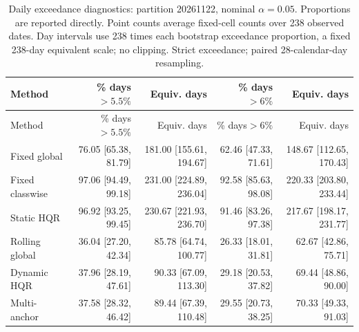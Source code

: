 \begingroup\small\setlength{\tabcolsep}{3pt}
\begin{longtable}{lrrrr}
\caption{Daily exceedance diagnostics: partition 20261122, nominal $\alpha=0.05$. Proportions are reported directly. Point counts average fixed-cell counts over 238 observed dates. Day intervals use 238 times each bootstrap exceedance proportion, a fixed 238-day equivalent scale; no clipping. Strict exceedance; paired 28-calendar-day resampling.}\label{tab:final-risk-1-0-exceed}\\
\toprule
Method & \% days$>5.5\%$ & Equiv. days & \% days$>6\%$ & Equiv. days\\
\midrule
\endfirsthead
\toprule
Method & \% days$>5.5\%$ & Equiv. days & \% days$>6\%$ & Equiv. days\\
\midrule
\endhead
Fixed global & 76.05 [65.38, 81.79] & 181.00 [155.61, 194.67] & 62.46 [47.33, 71.61] & 148.67 [112.65, 170.43]\\
Fixed classwise & 97.06 [94.49, 99.18] & 231.00 [224.89, 236.04] & 92.58 [85.63, 98.08] & 220.33 [203.80, 233.44]\\
Static HQR & 96.92 [93.25, 99.45] & 230.67 [221.93, 236.70] & 91.46 [83.26, 97.38] & 217.67 [198.17, 231.77]\\
Rolling global & 36.04 [27.20, 42.34] & 85.78 [64.74, 100.77] & 26.33 [18.01, 31.81] & 62.67 [42.86, 75.71]\\
Dynamic HQR & 37.96 [28.19, 47.61] & 90.33 [67.09, 113.30] & 29.18 [20.53, 37.82] & 69.44 [48.86, 90.00]\\
Multi-anchor & 37.58 [28.32, 46.42] & 89.44 [67.39, 110.48] & 29.55 [20.73, 38.25] & 70.33 [49.33, 91.03]\\
\bottomrule
\end{longtable}
\endgroup

